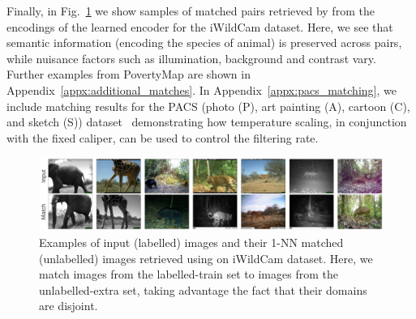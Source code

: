 Finally, in Fig.~\ref{fig:matches_examples} we show samples of matched pairs retrieved by \CNN{}
from the encodings of the learned encoder for the iWildCam dataset.
%
Here, we see that semantic information (encoding the species of animal) is preserved across pairs,
while nuisance factors such as illumination, background and contrast vary.
%
Further examples from PovertyMap are shown in Appendix~\ref{appx:additional_matches}. 
%
In Appendix~\ref{appx:pacs_matching}, we include matching results for the PACS (photo (P), art
painting (A), cartoon (C), and sketch (S)) dataset~\cite{li2017deeper} demonstrating how
temperature scaling, in conjunction with the fixed caliper, can be used to control the filtering
rate.

\begin{figure}[tbp]
  \centering
  \includegraphics[width=1.\textwidth]{figures/matches_examples_2.pdf}
  \caption{
    Examples of input (labelled) images and their 1-NN matched (unlabelled) images retrieved using
    \CNN{} on iWildCam dataset. 
    Here, we match images from the labelled-train set to images from the unlabelled-extra set,
    taking advantage the fact that their domains are disjoint.
  }
  \label{fig:matches_examples}
\end{figure}
